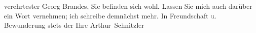                verehrtester Georg Brandes, Sie befin\textcolor{gray}{d}en sich wohl. Lassen Sie
               mich auch darüber ein Wort vernehmen; ich schreibe demnächst mehr. In Freundschaft u.
               Bewunderung stets der Ihre \spacefill\mbox{Arthur Schnitzler}\pend
           \endnumbering{}  \newcommand{\dateiname}{L02413}\newcommand{\titel}{Arthur Schnitzler an Georg Brandes, 23. 6. 1924}\newcommand{\editorInnen}{Martin Anton Müller und Gerd-Hermann Susen}
